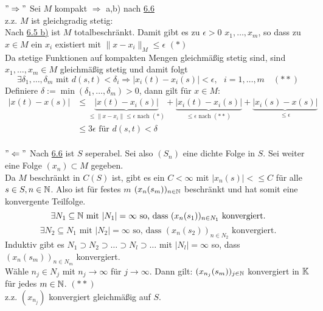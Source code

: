 \begin{beweis}
	$"\Rightarrow"$ Sei $M$ kompakt $\Rightarrow$ a,b) nach \hyperref[prop:6.6]{6.6} \\
	z.z. $M$ ist gleichgradig stetig: \\
	Nach \hyperref[satz:6.5b]{6.5 b)} ist $M$ totalbeschränkt. Damit gibt es zu $\epsilon > 0$ $x_{1}, \dotsc, x_{m}$, so dass zu $x \in M$ ein $x_{i}$ existiert mit $\| x - x_{i} \|_{M} \leq \epsilon$ $(*)$ \\
	Da stetige Funktionen auf kompakten Mengen gleichmä{\ss}ig stetig sind, sind$x_{1}, \dotsc, x_{m} \in M$ gleichmä{\ss}ig stetig und damit folgt 
	\[ \exists \delta_{1}, \dotsc, \delta_{m} \text{ mit } d(s, t) < \delta_{i} \Rightarrow |x_{i}(t) - x_{i}(s)| < \epsilon, \text{ } i = 1, \dotsc, m \quad (**) \]
	Definiere $\delta := \min(\delta_{1}, \dotsc, \delta_{m}) > 0$, dann gilt für $x \in M$:
	\begin{align*}
		| x(t) - x(s) | & \leq \underbrace{| x(t) - x_{i}(s) |}_{\leq \| x - x_{i} \| \leq \epsilon \text{ nach } (*) } + \underbrace{| x_{i}(t) - x_{i}(s) |}_{\leq \epsilon \text{ nach } (**) } + \underbrace{| x_{i}(s) - x(s) |}_{\leq \epsilon} \\
						& \leq 3 \epsilon \text{ für } d(s, t) < \delta 
	\end{align*} \\
	$"\Leftarrow"$ Nach \hyperref[prop:6.6]{6.6} ist $S$ seperabel. Sei also $(S_{n})$ eine dichte Folge in $S$. Sei weiter eine Folge $(x_{n}) \subset M$ gegeben. \\
	Da $M$ beschränkt in $C(S)$ ist, gibt es ein $C < \infty$ mit $| x_{n}(s) | <\leq C$ für alle $s \in S, n \in \mathbb{N}$. Also ist für festes $m$ $(x_{n}(s_{m}))_{n \in \mathbb{N}}$ beschränkt und hat somit eine konvergente Teilfolge. \\
	\[ \exists N_{1} \subseteq \mathbb{N} \text{ mit } |N_{1}| = \infty \text{ so, dass } (x_{n}(s_{1}))_{n \in N_{1}} \text{ konvergiert.}  \]
	\[ \exists N_{2} \subseteq N_{1} \text{ mit } |N_{2}| = \infty \text{ so, dass } (x_{n}(s_{2}))_{n \in N_{2}} \text{ konvergiert.}  \]	
	Induktiv gibt es $N_{1} \supset N_{2} \supset \dotsc \supset N_{l} \supset \dotsc$ mit $|N_{l}| = \infty$ so, dass $(x_{n}(s_{m}))_{n \in N_{m}}$ konvergiert. \\
	Wähle $n_{j} \in N_{j}$ mit $n_{j} \rightarrow \infty$ für $j \rightarrow \infty$. Dann gilt: $(x_{n_{j}}(s_{m}))_{j \in \mathbb{N}}$ konvergiert in $\mathbb{K}$ für jedes $m \in \mathbb{N}$. $(**)$ \\
	z.z. $(x_{n_{j}})$ konvergiert gleichmä{\ss}ig auf $S$. \\

\end{beweis}
